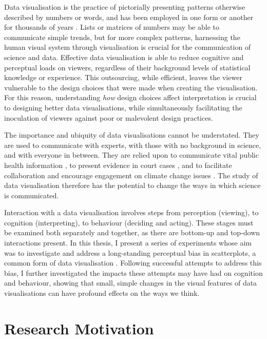 \documentclass[../main.tex]{subfiles}
\begin{document}
Data visualisation is the practice of pictorially presenting patterns
otherwise described by numbers or words, and has been employed in one
form or another for thousands of years \cite{azzam_2013}. Lists or
matrices of numbers may be able to communicate simple trends, but for
more complex patterns, harnessing the human visual system
\cite{midway_2020} through visualisation is crucial for the
communication of science and data. Effective data visualisation is able
to reduce cognitive and perceptual loads on viewers, regardless of their
background levels of statistical knowledge or experience. This
outsourcing, while efficient, leaves the viewer vulnerable to the design
choices that were made when creating the visualisation. For this reason,
understanding \emph{how} design choices affect interpretation is crucial
to designing better data visualisations, while simultaneously
facilitating the inoculation of viewers against poor or malevolent
design practices.

The importance and ubiquity of data visualisations cannot be
understated. They are used to communicate with experts, with those with
no background in science, and with everyone in between. They are relied
upon to communicate vital public health information
\cite{li_2021, koch_2021, clements_2023}, to present evidence in court
cases \cite{bobko_1979, mclachlan_2021}, and to facilitate collaboration
and encourage engagement on climate change issues
\cite{nocke_2008, tominski_2011, schuster_2024}. The study of data
visualisation therefore has the potential to change the ways in which
science is communicated.

Interaction with a data visualisation involves steps from perception
(viewing), to cognition (interpreting), to behaviour (deciding and
acting). These stages must be examined both separately and together, as
there are bottom-up and top-down interactions present. In this thesis, I
present a series of experiments whose aim was to investigate and address
a long-standing perceptual bias in scatterplots, a common form of data
visualisation \cite{friendly_2005}. Following successful attempts to
address this bias, I further investigated the impacts these attempts may
have had on cognition and behaviour, showing that small, simple changes
in the visual features of data visualisations can have profound effects
on the ways we think.

\section{Research Motivation}\label{research-motivation}
\end{document}
